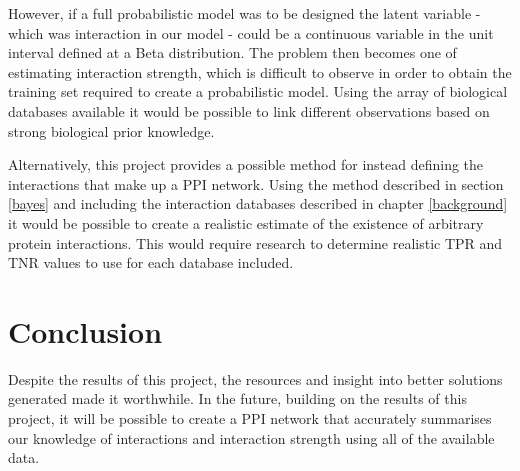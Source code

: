 However, if a full probabilistic model was to be designed the latent variable - which was interaction in our model - could be a continuous variable in the unit interval defined at a Beta distribution.
The problem then becomes one of estimating interaction strength, which is difficult to observe in order to obtain the training set required to create a probabilistic model.
Using the array of biological databases available it would be possible to link different observations based on strong biological prior knowledge.

Alternatively, this project provides a possible method for instead defining the interactions that make up a PPI network.
Using the method described in section \ref{bayes} and including the interaction databases described in chapter \ref{background} it would be possible to create a realistic estimate of the existence of arbitrary protein interactions.
This would require research to determine realistic TPR and TNR values to use for each database included.




\section*{Conclusion}

Despite the results of this project, the resources and insight into better solutions generated made it worthwhile.
In the future, building on the results of this project, it will be possible to create a \ac{PPI} network that accurately summarises our knowledge of interactions and interaction strength using all of the available data.
